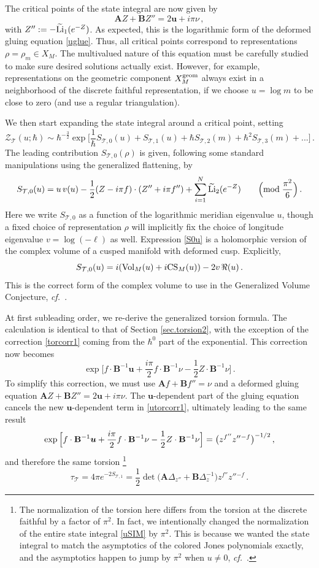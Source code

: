 \documentclass[12pt]{amsart}
\theoremstyle{definition}
\def\be{  \begin{equation} }
\def\ee{  \end{equation} }
\newcommand{\CZ}{\mathcal{Z}}
\newcommand{\CT}{\mathcal{T}}
\newcommand{\Li}{{\rm Li}}
\newcommand{\wt}{\widetilde}
\newcommand{\cf}{\emph{cf.}}
\newcommand{\mb}{\mathbf}
\numberwithin{equation}{section}
\begin{document}
The critical points of the state integral are now given by
%
\be \label{ucrit} \mb A Z+\mb B Z''=2\bm u+i\pi\nu\,,\ee
%
with $Z'':=-\wt\Li_1(e^{-Z})$. As expected, this is the logarithmic form of the deformed gluing equation \eqref{uglue}. Thus, all critical points correspond to representations $\rho=\rho_m\in X_M$. The multivalued nature of this equation must be carefully studied to make sure desired solutions actually exist. However, for example, representations on the geometric component $X_M^{\rm geom}$ always exist in a neighborhood of the discrete faithful representation, if we choose $u=\log m$ to be close to zero (and use a regular triangulation).

We then start expanding the state integral around a critical point, setting
%
\be \CZ_{\CT}(u;\hbar) \sim \hbar^{-\frac32}\exp\Big[\frac1\hbar S_{\CT,0}(u)+S_{\CT,1}(u)+\hbar S_{\CT,2}(m)+\hbar^2 S_{\CT,3}(m)+...\Big]\,.
\ee
%
The leading contribution $S_{\CT,0}(\rho)$ is given, following some standard manipulations using the generalized flattening, by
%
\be \label{S0u}
S_{\CT,0}(u) =   u\,v(u)-\frac12 (Z-i\pi f)\cdot (Z''+i\pi f'') 
+ \sum_{i=1}^N\wt\Li_2(e^{-Z})\qquad \Big(\text{mod}\;\frac{\pi^2}{6}\Big)\,.
\ee
%
Here we write $S_{\CT,0}$ as a function of the logarithmic meridian eigenvalue $u$, though a fixed choice of representation $\rho$ will implicitly fix the choice of longitude eigenvalue $v=\log(-\ell)$ as well. Expression \eqref{S0u} is a holomorphic version of the complex volume of a cusped manifold with deformed cusp. Explicitly,
%
\be S_{\CT,0}(u) = i({\rm Vol}_M(u)+i{\rm CS}_M(u)) -2v\,\Re(u)\,.\ee
%
This is the correct form of the complex volume to use in the Generalized Volume Conjecture, \cf\ \cite{GuM}.

At first subleading order, we re-derive the generalized torsion formula. The calculation is identical to that of Section \ref{sec.torsion2}, with the exception of the correction \eqref{torcorr1} coming from the $\hbar^0$ part of the exponential. This correction now becomes
%
\be \exp\Big[ f\cdot \mb B^{-1}\bm u+\frac{i\pi}{2}f\cdot \mb B^{-1}\nu-\frac12Z\cdot \mb B^{-1}\nu\Big]\,. \label{utorcorr1}\ee
%
To simplify this correction, we must use $\mb Af+\mb Bf''=\nu$ and a deformed gluing equation $\mb A Z+\mb B Z''=2\bm u+i\pi \nu$. The $\bm u$-dependent part of the gluing equation cancels the new $\bm u$-dependent term in \eqref{utorcorr1}, ultimately leading to the same result
%
\be \exp\Big[ f\cdot \mb B^{-1}\bm u+\frac{i\pi}{2}f\cdot \mb B^{-1}\nu-\frac12Z\cdot \mb B^{-1}\nu\Big] = \big(z{}^{f''}z''{}^{-f}\big)^{-1/2}\,, \notag
\ee
%
and therefore the same torsion%
%
\footnote{The normalization of the torsion here differs from the torsion at the discrete faithful by a factor of $\pi^2$. In fact, we intentionally changed the normalization of the entire state integral \eqref{uSIM} by $\pi^2$. This is because we wanted the state integral to match the asymptotics of the colored Jones polynomials exactly, and the asymptotics happen to jump by $\pi^2$ when $u\neq 0$, \cf\ \cite{GuM}.}
%
\be \tau_\CT = 4\pi e^{-2S_{\CT,1}} = \frac12\det\big(\mb A\Delta_{z''}
+\mb B\Delta_z^{-1}\big)z^{f''}z''{}^{-f}\,.\ee
\end{document}
